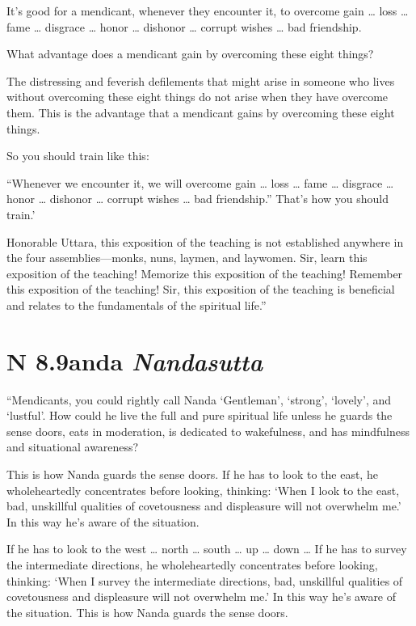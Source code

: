 \documentclass[12pt,openany]{book}%
\newcommand*{\suttatitleacronym}[1]{\smaller[2]{#1}\vspace*{.3em}}
\newcommand*{\suttatitletranslation}[1]{\linebreak{#1}}
\newcommand*{\suttatitleroot}[1]{\linebreak\smaller[2]\itshape{#1}}
\newcommand*{\tocacronym}[1]{\hspace*{-3.3em}{#1}\quad}
\newcommand*{\toctranslation}[1]{#1}
\newcommand*{\tocroot}[1]{(\textit{#1})}
\begin{document}
It’s good for a mendicant, whenever they encounter it, to overcome gain … loss … fame … disgrace … honor … dishonor … corrupt wishes … bad friendship. 

What advantage does a mendicant gain by overcoming these eight things? 

The distressing and feverish defilements that might arise in someone who lives without overcoming these eight things do not arise when they have overcome them. This is the advantage that a mendicant gains by overcoming these eight things. 

So you should train like this: 

“Whenever we encounter it, we will overcome gain … loss … fame … disgrace … honor … dishonor … corrupt wishes … bad friendship.” That’s how you should train.’ 

Honorable Uttara, this exposition of the teaching is not established anywhere in the four assemblies—monks, nuns, laymen, and laywomen. Sir, learn this exposition of the teaching! Memorize this exposition of the teaching! Remember this exposition of the teaching! Sir, this exposition of the teaching is beneficial and relates to the fundamentals of the spiritual life.” 

%
\section*{{\suttatitleacronym AN 8.9}{\suttatitletranslation Nanda }{\suttatitleroot Nandasutta}}
\addcontentsline{toc}{section}{\tocacronym{AN 8.9} \toctranslation{Nanda } \tocroot{Nandasutta}}

“Mendicants, you could rightly call Nanda ‘Gentleman’, ‘strong’, ‘lovely’, and ‘lustful’. How could he live the full and pure spiritual life unless he guards the sense doors, eats in moderation, is dedicated to wakefulness, and has mindfulness and situational awareness? 

This is how Nanda guards the sense doors. If he has to look to the east, he wholeheartedly concentrates before looking, thinking: ‘When I look to the east, bad, unskillful qualities of covetousness and displeasure will not overwhelm me.’ In this way he’s aware of the situation. 

If he has to look to the west … north … south … up … down … If he has to survey the intermediate directions, he wholeheartedly concentrates before looking, thinking: ‘When I survey the intermediate directions, bad, unskillful qualities of covetousness and displeasure will not overwhelm me.’ In this way he’s aware of the situation. This is how Nanda guards the sense doors. 
\end{document}
